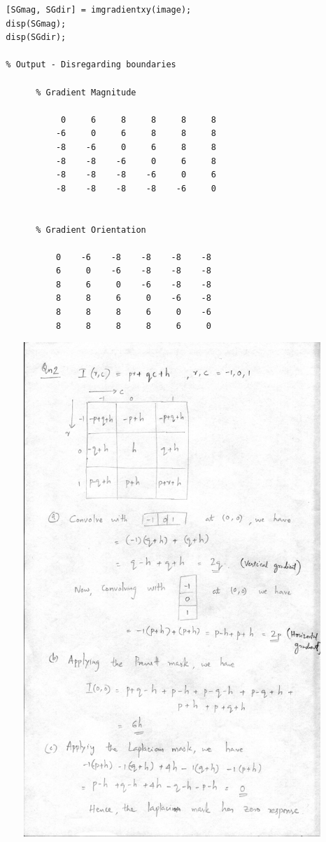 \documentclass{article}
\begin{document}
\begin{verbatim}
  [SGmag, SGdir] = imgradientxy(image);
  disp(SGmag);
  disp(SGdir);

  % Output - Disregarding boundaries

        % Gradient Magnitude

             0     6     8     8     8     8     
            -6     0     6     8     8     8     
            -8    -6     0     6     8     8     
            -8    -8    -6     0     6     8     
            -8    -8    -8    -6     0     6     
            -8    -8    -8    -8    -6     0     


        % Gradient Orientation            

            0    -6    -8    -8    -8    -8    
            6     0    -6    -8    -8    -8    
            8     6     0    -6    -8    -8    
            8     8     6     0    -6    -8    
            8     8     8     6     0    -6    
            8     8     8     8     6     0    
\end{verbatim}

\begin{figure}
\includegraphics[width=15cm]{qn2.jpg}
\end{figure}
\end{document}
